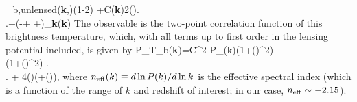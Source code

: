 \delta{}_{\rm b,unlensed}({\bf{k}},)(1-2\kappa) +C\left\lbrace \tilde{\delta}({\bf{k}})2(\cdot{})\right.\\
\left.+\left(-+\bm{\sigma}
+\bm{\Omega}\right)\cdot\bm{\nabla}_{\bf{k}}\tilde{\delta}({\bf{k}})\right\rbrace
\ega
\eeq
The observable is the two-point correlation function of this brightness temperature, which, with all terms up to first order in the lensing potential included, is given by
\beq
\bga
P_{T_{\rm b}}({\bf{k}})=C^2 P_{\delta}(k)\left(1+(\cdot{})^2\right) \times\\
\left\lbrace \left(1+(\cdot{})^2\right) \right.\\
\left. + 4(\cdot{})\left(\cdot\bm{\sigma}\cdot{}+(\bm{\Omega}\times{})\cdot{}\right)\right\rbrace,
\label{eq:Tb_power}
\ega
\eeq
where $n_{\rm eff}(k)\equiv d\ln P(k)/d\ln k$ is the effective spectral index (which is a function of the range of $k$ and redshift of interest; in our case, $n_{\rm eff}\sim -2.15$).

